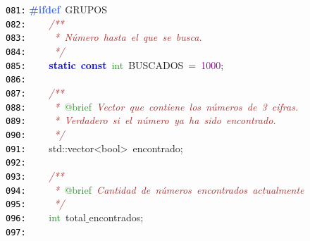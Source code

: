 \documentclass[a4paper,10pt]{scrartcl}
\begin{document}
{   \mbox{}\texttt{\textcolor{Black}{081:}} \textbf{\textcolor{RoyalBlue}{\#ifdef}}\ GRUPOS \\
   \mbox{}\texttt{\textcolor{Black}{082:}} \ \ \ \ \textit{\textcolor{Brown}{/**}} \\
   \mbox{}\texttt{\textcolor{Black}{083:}} \textit{\textcolor{Brown}{\ \ \ \ \ *\ Número\ hasta\ el\ que\ se\ busca.}} \\
   \mbox{}\texttt{\textcolor{Black}{084:}} \textit{\textcolor{Brown}{\ \ \ \ \ */}} \\
   \mbox{}\texttt{\textcolor{Black}{085:}} \ \ \ \ \textbf{\textcolor{Blue}{static}}\ \textbf{\textcolor{Blue}{const}}\ \textcolor{ForestGreen}{int}\ BUSCADOS\ \textcolor{BrickRed}{=}\ \textcolor{Purple}{1000}\textcolor{BrickRed}{;} \\
   \mbox{}\texttt{\textcolor{Black}{086:}} \ \  \\
   \mbox{}\texttt{\textcolor{Black}{087:}} \ \ \ \ \textit{\textcolor{Brown}{/**}} \\
   \mbox{}\texttt{\textcolor{Black}{088:}} \textit{\textcolor{Brown}{\ \ \ \ \ *\ }}\textcolor{ForestGreen}{@brief}\textit{\textcolor{Brown}{\ Vector\ que\ contiene\ los\ números\ de\ 3\ cifras.}} \\
   \mbox{}\texttt{\textcolor{Black}{089:}} \textit{\textcolor{Brown}{\ \ \ \ \ *\ Verdadero\ si\ el\ número\ ya\ ha\ sido\ encontrado.}} \\
   \mbox{}\texttt{\textcolor{Black}{090:}} \textit{\textcolor{Brown}{\ \ \ \ \ */}} \\
   \mbox{}\texttt{\textcolor{Black}{091:}} \ \ \ \ std\textcolor{BrickRed}{::}\textcolor{TealBlue}{vector\textless{}bool\textgreater{}}\ encontrado\textcolor{BrickRed}{;} \\
   \mbox{}\texttt{\textcolor{Black}{092:}} \ \  \\
   \mbox{}\texttt{\textcolor{Black}{093:}} \ \ \ \ \textit{\textcolor{Brown}{/**}} \\
   \mbox{}\texttt{\textcolor{Black}{094:}} \textit{\textcolor{Brown}{\ \ \ \ \ *\ }}\textcolor{ForestGreen}{@brief}\textit{\textcolor{Brown}{\ Cantidad\ de\ números\ encontrados\ actualmente}} \\
   \mbox{}\texttt{\textcolor{Black}{095:}} \textit{\textcolor{Brown}{\ \ \ \ \ */}} \\
   \mbox{}\texttt{\textcolor{Black}{096:}} \ \ \ \ \textcolor{ForestGreen}{int}\ total$\_$encontrados\textcolor{BrickRed}{;} \\
   \mbox{}\texttt{\textcolor{Black}{097:}} \ \  \\
}
\end{document}
